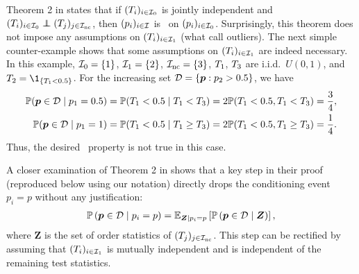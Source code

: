 Theorem 2 in \cite{bates21_testin_outlier_with_confor_p_values} states that if $({T_{i}})_{i \in {\mathcal{I}_{0}}}$ is jointly independent and $(\testStatistics{i})_{i \in \nullHypothesisIndex} \independent (\testStatistics{j})_{j \in \hypothesisIndex{\text{nc}}}$, then $({p_{i}})_{i \in {\mathcal{I}_{}}}$ is \PRDS~on $({p_{i}})_{i \in {\mathcal{I}_{0}}}$.
Surprisingly, this theorem does not impose any assumptions on
$({T_{i}})_{i \in {\mathcal{I}_{1}}}$ (what
\textcite{bates21_testin_outlier_with_confor_p_values} call outliers). The
next simple counter-example shows that some assumptions on
$({T_{i}})_{i \in {\mathcal{I}_{1}}}$ are indeed
necessary.   %
In this example, ${\mathcal{I}_{0}} = \{1\}$, $ {\mathcal{I}_{1}} =
\{2\}$, ${\mathcal{I}_{\text{nc}}} = \{3\}$,
${T_{1}}$, ${T_{3}}$ are i.i.d.\ $U(0,1)$,
and $\testStatistics{2} = \1_{\{\testStatistics{1} < 0.5\}}$. For the
increasing set $\mathcal{D} = \{{\boldsymbol{p}}: {p_{2}} > 0.5\}$, we have
\begin{align*}
    \mathbb{P}({\boldsymbol{p}} \in \mathcal{D} \mid {p_{1}} = 0.5)
    &= \mathbb{P}({T_{1}} < 0.5 \mid {T_{1}} <
      {T_{3}}) = 2 \mathbb{P}({T_{1}} < 0.5, {T_{1}} < {T_{3}})
    = \frac{3}{4}, \\
    \mathbb{P}({\boldsymbol{p}} \in \mathcal{D} \mid {p_{1}} = 1)
    &= \mathbb{P}({T_{1}} < 0.5 \mid {T_{1}} \ge
      {T_{3}}) = 2 \mathbb{P}({T_{1}} < 0.5, {T_{1}} \ge {T_{3}})
    = \frac{1}{4}.
\end{align*}
Thus, the desired \PRDS~property is not true in this case.

A closer examination of Theorem 2 in
\cite{bates21_testin_outlier_with_confor_p_values} shows that a key
step in their proof (reproduced below using our notation) directly drops the
conditioning event $p_i = p$ without any justification:
\begin{align*}
    \mathbb{P}\left({\boldsymbol{p}} \in \mathcal{D} \mid {p_{i}} = p \right)
    = \mathbb{E}_{\boldsymbol{Z}| {p_{i}} = p}\left[ \mathbb{P}\left({\boldsymbol{p}} \in \mathcal{D} \mid \boldsymbol{Z} \right)\right],
\end{align*}
where $\boldsymbol{Z}$ is the set of order statistics of
$({T_{j}})_{j \in{\mathcal{I}_{ \text{nc}}}}$. This step
can be rectified by assuming that $({T_{i}})_{i \in
  {\mathcal{I}_{1}}}$ is mutually independent and is independent of
the remaining test statistics.



